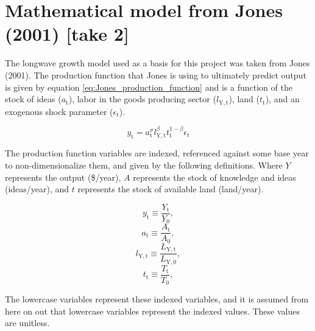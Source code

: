 \documentclass[letterpaper,12pt]{article}
\begin{document}

\section{Mathematical model from Jones (2001) [take 2]}
The longwave growth model used as a basis for this project was taken from Jones (2001). The production function that Jones is using to ultimately predict output is given by equation \ref{eq:Jones_production_function} and is a function of the stock of ideas ($a_\mathrm{t}$), labor in the goods producing sector ($l_\mathrm{Y,t}$), land ($t_\mathrm{t}$), and an exogenous shock parameter ($\epsilon_\mathrm{t}$).

\begin{equation} \label{eq:Jones_production_function}
y_\mathrm{t} = a_\mathrm{t} ^\sigma l_\mathrm{Y,t} ^\beta t_\mathrm{t} ^{1-\beta} \epsilon_\mathrm{t}
\end{equation}

The production function variables are indexed, referenced against some base year to non-dimensionalize them, and given by the following definitions. Where $Y$ represents the output (\$/year), $A$ represents the stock of knowledge and ideas (ideas/year), and $t$ represents the stock of available land (land/year).

\begin{equation} \label{eq:index_y}
y_\mathrm{t} \equiv \frac{Y_\mathrm{t}}{Y_\mathrm{0}},
\end{equation}
\begin{equation} \label{eq:index_a}
a_\mathrm{t} \equiv \frac{A_\mathrm{t}}{A_\mathrm{0}},
\end{equation}
\begin{equation} \label{eq:index_l}
l_\mathrm{Y,t} \equiv \frac{L_\mathrm{Y,t}}{L_\mathrm{Y,0}},
\end{equation}
\begin{equation} \label{eq:index_t}
t_\mathrm{t} \equiv \frac{T_\mathrm{t}}{T_\mathrm{0}},
\end{equation}

The lowercase variables represent these indexed variables, and it is assumed from here on out that lowercase variables represent the indexed values. These values are unitless.
\end{document}
